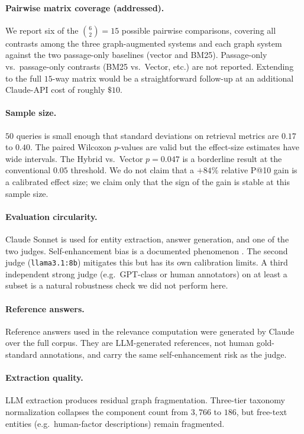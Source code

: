 \documentclass[10pt,a4paper]{article}
\begin{document}
\paragraph{Pairwise matrix coverage (addressed).}
We report six of the $\binom{6}{2} = 15$ possible pairwise
comparisons, covering all contrasts among the three
graph-augmented systems and each graph system against the two
passage-only baselines (vector and BM25). Passage-only vs.\
passage-only contrasts (BM25 vs.\ Vector, etc.) are not reported.
Extending to the full $15$-way matrix would be a straightforward
follow-up at an additional Claude-API cost of roughly $\$10$.

\paragraph{Sample size.}
$50$ queries is small enough that standard deviations on retrieval
metrics are $0.17$ to $0.40$. The paired Wilcoxon $p$-values are
valid but the effect-size estimates have wide intervals. The Hybrid
vs.\ Vector $p = 0.047$ is a borderline result at the conventional
$0.05$ threshold. We do not claim that a $+84\%$ relative P@10 gain
is a calibrated effect size; we claim only that the sign of the gain
is stable at this sample size.

\paragraph{Evaluation circularity.}
Claude Sonnet is used for entity extraction, answer generation, and
one of the two judges. Self-enhancement bias is a documented
phenomenon \citep{zheng2024judgingllm}. The second judge
(\texttt{llama3.1:8b}) mitigates this but has its own calibration
limits. A third independent strong judge (e.g.\ GPT-class or
human annotators) on at least a subset is a natural robustness
check we did not perform here.

\paragraph{Reference answers.}
Reference answers used in the relevance computation were generated
by Claude over the full corpus. They are LLM-generated references,
not human gold-standard annotations, and carry the same
self-enhancement risk as the judge.

\paragraph{Extraction quality.}
LLM extraction produces residual graph fragmentation. Three-tier
taxonomy normalization collapses the component count from $3{,}766$
to $186$, but free-text entities (e.g.\ human-factor descriptions)
remain fragmented.
\end{document}
